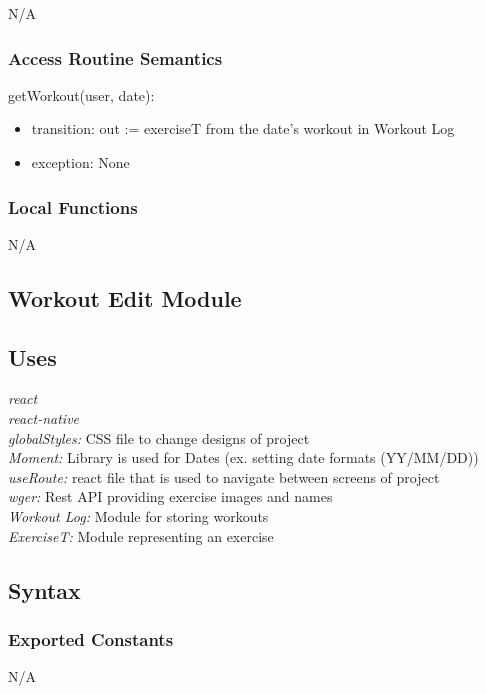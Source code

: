 \documentclass[12pt, titlepage]{article}
\begin{document}
N/A

\subsubsection{Access Routine Semantics}

\noindent getWorkout(user, date):
\begin{itemize}
	\item transition: out := exerciseT from the date's workout in Workout Log
	\item exception: None
\end{itemize}

\subsubsection{Local Functions}

N/A


\subsection{Workout Edit Module}

\subsection{Uses}
{\textit{react}}\\
{\textit{react-native}}\\
{\textit{globalStyles:} CSS file to change designs of project}\\
{\textit{Moment:} Library is used for Dates (ex. setting date formats (YY/MM/DD))}\\
{\textit{useRoute:} react file that is used to navigate between screens of project}\\
{\textit{wger:} Rest API providing exercise images and names}\\
{\textit{Workout Log:} Module for storing workouts}\\
{\textit{ExerciseT:} Module representing an exercise}\\

\subsection{Syntax}

\subsubsection{Exported Constants}
N/A
\end{document}
